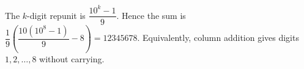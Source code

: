 The $k$-digit repunit is $\dfrac{10^k-1}{9}$. Hence the sum is $\dfrac{1}{9}\left(\dfrac{10(10^8-1)}{9}-8\right)=\boxed{12345678}$. Equivalently, column addition gives digits $1,2,\ldots,8$ without carrying.
